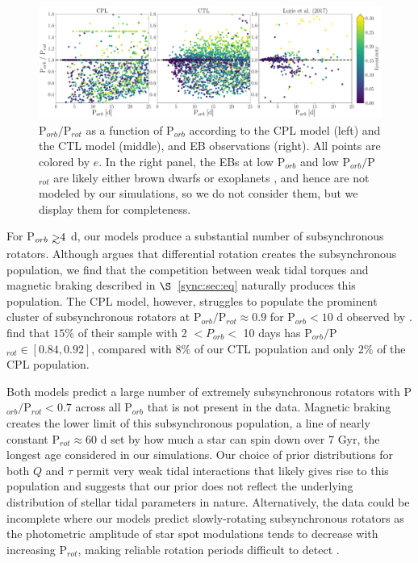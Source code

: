 \begin{figure}
	\includegraphics[width=\columnwidth]{lurieFig7.pdf}
   \caption{P$_{orb}/$P$_{rot}$ as a function of P$_{orb}$ according to the CPL model (left) and the CTL model (middle), and \citet{Lurie2017} \kepler EB observations (right). All points are colored by $e$.  In the right panel, the \kepler EBs at low P$_{orb}$ and low P$_{orb}/$P$_{rot}$ are likely either brown dwarfs or exoplanets \citep{Lurie2017}, and hence are not modeled by our simulations, so we do not consider them, but we display them for completeness.}%
    \label{sync:fig:lurie7}%
\end{figure}

For P$_{orb} \gsim 4$ d, our models produce a substantial number of subsynchronous rotators. Although \citet{Lurie2017} argues that differential rotation creates the subsynchronous population, we find that the competition between weak tidal torques and magnetic braking described in $\S$~\ref{sync:sec:eq} naturally produces this population. The CPL model, however, struggles to populate the prominent cluster of subsynchronous rotators at P$_{orb}/$P$_{rot} \approx 0.9$ for P$_{orb} < 10$ d observed by \citet{Lurie2017}.  \citet{Lurie2017} find that $15\%$ of their sample with 2 $< P_{orb} <$ 10 days has P$_{orb}/$P$_{rot} \in [0.84, 0.92]$, compared with $8\%$ of our CTL population and only $2\%$ of the CPL population.

Both models predict a large number of extremely subsynchronous rotators with P$_{orb}/$P$_{rot} < 0.7$ across all P$_{orb}$ that is not present in the \citet{Lurie2017} data. Magnetic braking creates the lower limit of this subsynchronous population, a line of nearly constant P$_{rot} \approx 60$ d set by how much a star can spin down over 7 Gyr, the longest age considered in our simulations. Our choice of prior distributions for both $Q$ and $\tau$ permit very weak tidal interactions that likely gives rise to this population and suggests that our prior does not reflect the underlying distribution of stellar tidal parameters in nature. Alternatively, the data could be incomplete where our models predict slowly-rotating subsynchronous rotators as the photometric amplitude of star spot modulations tends to decrease with increasing P$_{rot}$, making reliable rotation periods difficult to detect \citep{McQuillan2014,Lurie2017,Reinhold2018}. 


